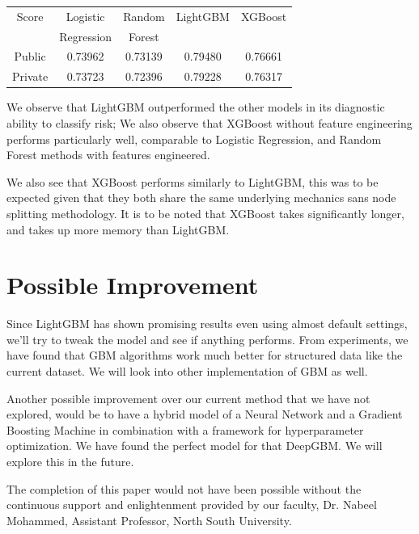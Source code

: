 \documentclass[sigconf, nonacm]{acmart}
\begin{document}
\begin{tabular}{|c|c|c|c|c|}
\hline
    Score & Logistic & Random & LightGBM & XGBoost \\
        & Regression & Forest & & \\
\hline
    Public & 0.73962 & 0.73139 & 0.79480 & 0.76661 \\
    Private & 0.73723 & 0.72396 & 0.79228 & 0.76317 \\
\hline
\end{tabular}



We observe that LightGBM outperformed the other models in its diagnostic ability to classify risk; We also observe that XGBoost without feature engineering performs particularly well, comparable to Logistic Regression, and Random Forest methods with features engineered.

We also see that XGBoost performs similarly to LightGBM, this was to be expected given that they both share the same underlying mechanics sans node splitting methodology. It is to be noted that XGBoost takes significantly longer, and takes up more memory than LightGBM.

\section{Possible Improvement}

Since LightGBM has shown promising results even using almost default settings, we'll try to tweak the model and see if anything performs. From experiments, we have found that GBM algorithms work much better for structured data like the current dataset. We will look into other implementation of GBM as well.

Another possible improvement over our current method that we have not explored, would be to have a hybrid model of a Neural Network and a Gradient Boosting Machine in combination with a framework for hyperparameter optimization. We have found the perfect model for that DeepGBM\cite{deepgbm}. We will explore this in the future.

\begin{acks}
 The completion of this paper would not have been possible without the continuous support and enlightenment provided by our faculty, Dr. Nabeel Mohammed, Assistant Professor, North South University.
\end{acks}

\end{document}
